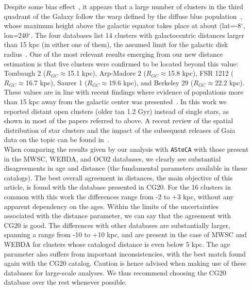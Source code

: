 \documentclass{aa}
\begin{document}
  Despite some bias effect~\citep[e.g., lower dust absorption, particularly
  along the Fitzgerald window][]{Fitzgerald_1968}, it appears that a large
  number of clusters in the third quadrant of the Galaxy follow the warp defined
  by the diffuse blue population~\citep{Carraro_2005_detection,Moitinho_2006},
  whose maximum height above the galactic equator takes place at about
  (lat=-8$^{\circ}$, lon=240$^{\circ}$.
  The four databases list 14 clusters with galactocentric distances larger
  than 15 kpc (in either one of them), the assumed limit for the galactic disk
  radius~\citep[see][and references therein]{Carraro_2010}.
  One of the most relevant results emerging from our new distance estimation is
  that five clusters were confirmed to be located beyond this value: Tombaugh 2 ($R_{GC}\approx$15.1 kpc), Arp-Madore 2
  ($R_{GC}\approx$15.8 kpc), FSR 1212 ($R_{GC}\approx$16.7 kpc), Saurer 1
  ($R_{GC}\approx$19.6 kpc), and Berkeley 29 ($R_{GC}\approx$22.2 kpc). These
  values are in line with recent findings where evidence of populations more than
  15 kpc away from the galactic center was presented~\citep[][and references
  therein]{Liu_2017,Lopez_2018}.
  In this work we   reported distant open clusters (older tan 1.2 Gyr)
  instead of single stars, as shown in most of the papers referred to above.
  A recent review of the spatial distribution of star clusters and
  the impact of the subsequent releases of Gaia data on the topic can be found
  in~\cite{Cantat-Gaudin_2022}.\\

  When comparing the results given by our analysis with \texttt{ASteCA} with
  those present in the MWSC, WEBDA, and OC02 databases, we clearly
  see substantial disagreements in age and distance (the fundamental
  parameters available in these catalogs).
  The best overall agreement in distances, the main objective of this article,
  is found with the database presented in CG20. For the 16 clusters in
  common with this work the differences range from -2 to +3 kpc, without any
  apparent dependency on the ages. Within the limits of the uncertainties
  associated with the distance parameter, we can say that the agreement with
  CG20 is good.
  The differences with other databases are substantially larger, spanning a
  range from -10 to +10 kpc, and are present in the case of MWSC and WEBDA for
  clusters whose cataloged distance is even below 5 kpc.
  The age parameter also suffers  from important inconsistencies, with
  the best match found again with the CG20 catalog.
  Caution is hence advised when making use of these databases for large-scale
  analyses. We thus recommend choosing the CG20 database over the rest whenever
  possible.
\end{document}
